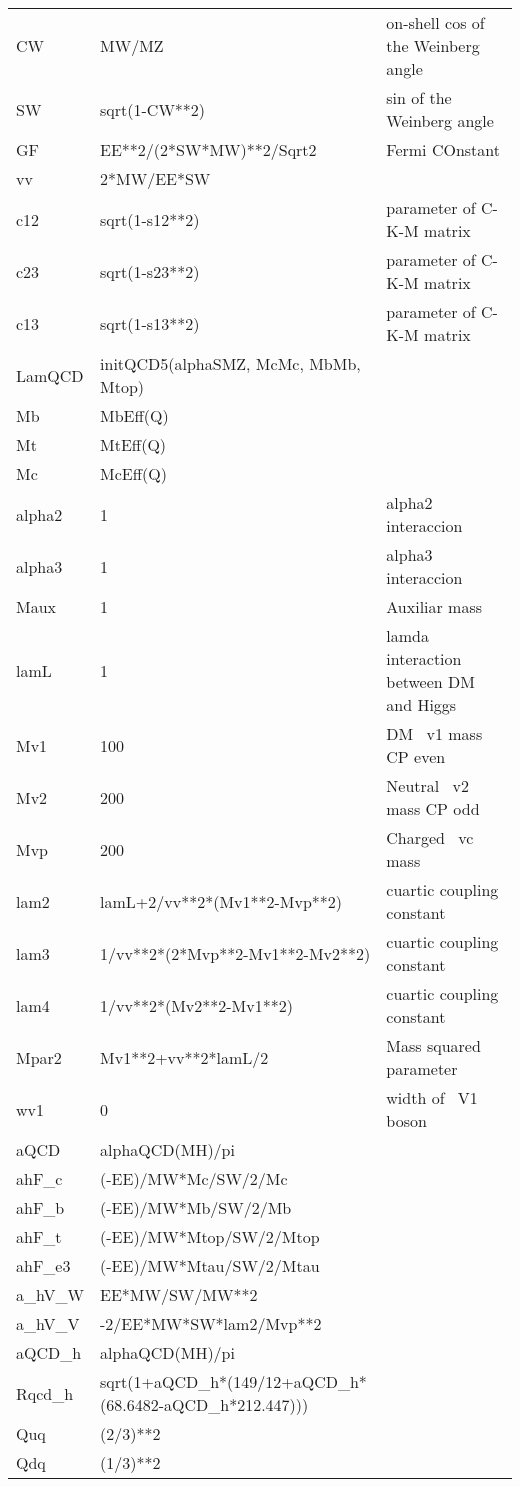 \begin{tabular}{|l|l|l|}
CW    &MW/MZ               &on-shell cos of the Weinberg angle \\
SW    &sqrt(1-CW**2)       &sin of the Weinberg angle \\
GF    &EE**2/(2*SW*MW)**2/Sqrt2&Fermi COnstant \\
vv    &2*MW/EE*SW          & \\
c12   &sqrt(1-s12**2)      &parameter  of C-K-M matrix \\
c23   &sqrt(1-s23**2)      &parameter  of C-K-M matrix \\
c13   &sqrt(1-s13**2)      &parameter  of C-K-M matrix \\
LamQCD&initQCD5(alphaSMZ, McMc, MbMb, Mtop)& \\
Mb    &MbEff(Q)            & \\
Mt    &MtEff(Q)            & \\
Mc    &McEff(Q)            & \\
alpha2&1                   &alpha2 interaccion \\
alpha3&1                   &alpha3 interaccion \\
Maux  &1                   &Auxiliar mass \\
lamL  &1                   &lamda interaction between DM and Higgs \\
Mv1   &100                 &DM ~v1 mass CP even \\
Mv2   &200                 &Neutral ~v2 mass CP odd \\
Mvp   &200                 &Charged ~vc mass \\
lam2  &lamL+2/vv**2*(Mv1**2-Mvp**2)&cuartic coupling constant \\
lam3  &1/vv**2*(2*Mvp**2-Mv1**2-Mv2**2)&cuartic coupling constant \\
lam4  &1/vv**2*(Mv2**2-Mv1**2)&cuartic coupling constant \\
Mpar2 &Mv1**2+vv**2*lamL/2 &Mass squared parameter \\
wv1   &0                   &width of ~V1 boson \\
aQCD  &alphaQCD(MH)/pi     & \\
ahF_c &(-EE)/MW*Mc/SW/2/Mc & \\
ahF_b &(-EE)/MW*Mb/SW/2/Mb & \\
ahF_t &(-EE)/MW*Mtop/SW/2/Mtop& \\
ahF_e3&(-EE)/MW*Mtau/SW/2/Mtau& \\
a_hV_W&EE*MW/SW/MW**2      & \\
a_hV_V&-2/EE*MW*SW*lam2/Mvp**2& \\
aQCD_h&alphaQCD(MH)/pi     & \\
Rqcd_h&sqrt(1+aQCD_h*(149/12+aQCD_h*(68.6482-aQCD_h*212.447)))& \\
Quq   &(2/3)**2            & \\
Qdq   &(1/3)**2            & \\ \hline
\end{tabular}
